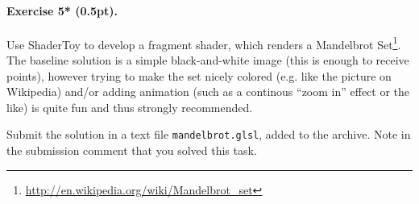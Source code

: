 \documentclass{article}
\newenvironment{exercise}[2]{\paragraph{Exercise #1 (#2pt).} }{
\medskip}
\begin{document}
\begin{exercise}{5*}{0.5}
Use ShaderToy to develop a fragment shader, which renders a Mandelbrot Set\footnote{\url{http://en.wikipedia.org/wiki/Mandelbrot_set}}. The baseline solution is a simple black-and-white image (this is enough to receive points), however trying to make the set nicely colored (e.g. like the picture on Wikipedia) and/or adding animation (such as a continous ``zoom in'' effect or the like) is quite fun and thus strongly recommended.

Submit the solution in a text file \texttt{mandelbrot.glsl}, added to the archive. Note in the submission comment that you solved this task.
\end{exercise}
\end{document}
